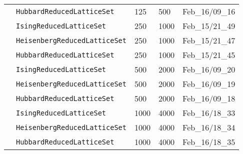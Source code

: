 \begin{tabular}{lllll}
                                 & \texttt{HubbardReducedLatticeSet} &                                      125 &                                      500 &                           Feb\_16/09\_16 \\
                                 & \texttt{IsingReducedLatticeSet} &                                      250 &                                     1000 &                           Feb\_15/21\_49 \\
                                 & \texttt{HeisenbergReducedLatticeSet} &                                      250 &                                     1000 &                           Feb\_15/21\_47 \\
                                 & \texttt{HubbardReducedLatticeSet} &                                      250 &                                     1000 &                           Feb\_15/21\_45 \\
                                 & \texttt{IsingReducedLatticeSet} &                                      500 &                                     2000 &                           Feb\_16/09\_20 \\
                                 & \texttt{HeisenbergReducedLatticeSet} &                                      500 &                                     2000 &                           Feb\_16/09\_19 \\
                                 & \texttt{HubbardReducedLatticeSet} &                                      500 &                                     2000 &                           Feb\_16/09\_18 \\
                                 & \texttt{IsingReducedLatticeSet} &                                     1000 &                                     4000 &                           Feb\_16/18\_33 \\
                                 & \texttt{HeisenbergReducedLatticeSet} &                                     1000 &                                     4000 &                           Feb\_16/18\_34 \\
                                 & \texttt{HubbardReducedLatticeSet} &                                     1000 &                                     4000 &                           Feb\_16/18\_35 \\
\hline
\end{tabular}
